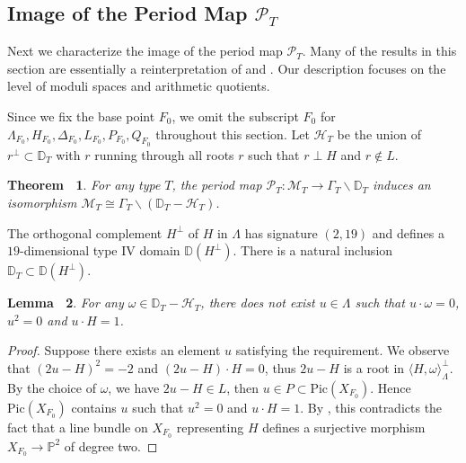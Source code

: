 \documentclass[12pt,reqno,a4paper]{amsart}
\newtheorem{thm}{Theorem~}[section]
\newtheorem{lem}[thm]{Lemma~}
\theoremstyle{remark}
\theoremstyle{definition}
\begin{document}
\subsection{Image of the Period Map $\mathscr{P}_T$}
\label{subsec: image of period map}
Next we characterize the image of the period map $\mathscr{P}_T$. Many of the results in this section are essentially a reinterpretation of \cite[Theorem 1.16]{urabe1988combinations} and \cite[Theorem 3.4.1]{degtyarev2008deformations}. Our description focuses on the level of moduli spaces and arithmetic quotients.


Since we fix the base point $F_0$, we omit the subscript $F_0$ for $\Lambda_{F_0},H_{F_0},\Delta_{F_0},L_{F_0},P_{F_0},Q_{F_0}$ throughout this section.
Let $\mathcal{H}_T$ be the union of $r^{\perp}\subset \mathbb{D}_T$ with $r$ running through all roots $r$ such that $r\perp H$ and $r\notin L$.


\begin{thm}
\label{thm: open}
For any type $T$, the period map $\mathscr{P}_T\colon\mathcal{M}_T\to\Gamma_T\backslash\mathbb{D}_T$ induces an isomorphism $\mathcal{M}_T \cong \Gamma_T\backslash (\mathbb{D}_T-\mathcal{H}_T)$.
\end{thm}

The orthogonal complement $H^\perp$ of $H$ in $\Lambda$ has signature $(2,19)$ and defines a $19$-dimensional type IV domain $\mathbb{D}(H^\perp)$.
There is a natural inclusion $\mathbb{D}_T \subset \mathbb{D}(H^\perp)$.

\begin{lem}
\label{lem: no calH'_T}
    For any $\omega\in \mathbb{D}_T-\mathcal{H}_T$, there does not exist $u\in \Lambda$ such that $u\cdot\omega=0$, $u^2=0$ and $u\cdot H=1$.
\end{lem}
\begin{proof}
Suppose there exists an element $u$ satisfying the requirement.
We observe that $(2u-H)^2=-2$ and $(2u-H)\cdot H=0$, thus $2u-H$ is a root in $\langle H,\omega \rangle^\perp_{\Lambda}$.
    By the choice of $\omega$, we have $2u-H\in L$, then $u\in P \subset \mathrm{Pic}(X_{F_0})$.
Hence $\mathrm{Pic}(X_{F_0})$ contains $u$ such that $u^2=0$ and $u\cdot H=1$.
    By \cite[Proposition 1.7]{urabe1988combinations}, this contradicts the fact that a line bundle on $X_{F_0}$ representing $H$ defines a surjective morphism $X_{F_0}\to \mathbb{P}^2$ of degree two.
\end{proof}
\end{document}
